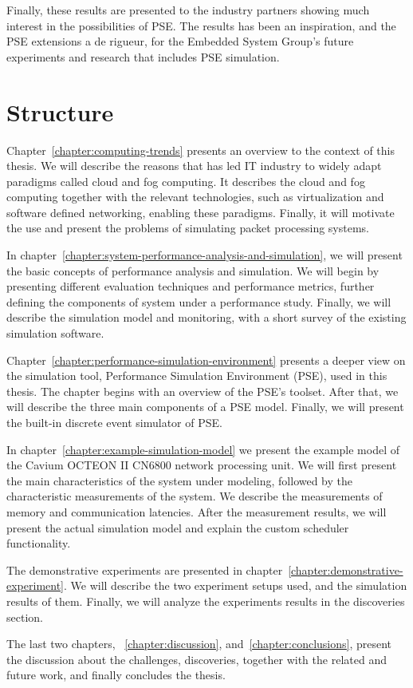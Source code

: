 Finally, these results are presented to the industry partners showing much interest in the possibilities of PSE. The results has been an inspiration, and the PSE extensions a de rigueur, for the Embedded System Group's future experiments and research that includes PSE simulation.

\section{Structure}
Chapter~\ref{chapter:computing-trends} presents an overview to the context of this thesis. We will describe the reasons that has led IT industry to widely adapt paradigms called cloud and fog computing. It describes the cloud and fog computing together with the relevant technologies, such as virtualization and software defined networking, enabling these paradigms. Finally, it will motivate the use and present the problems of simulating packet processing systems.

In chapter~\ref{chapter:system-performance-analysis-and-simulation}, we will present the basic concepts of performance analysis and simulation. We will begin by presenting different evaluation techniques and performance metrics, further defining the components of system under a performance study. Finally, we will describe the simulation model and monitoring, with a short survey of the existing simulation software.

Chapter~\ref{chapter:performance-simulation-environment} presents a deeper view on the simulation tool, Performance Simulation Environment (PSE), used in this thesis. The chapter begins with an overview of the PSE's toolset. After that, we will describe the three main components of a PSE model. Finally, we will present the built-in discrete event simulator of PSE.

In chapter~\ref{chapter:example-simulation-model} we present the example model of the Cavium OCTEON II CN6800 network processing unit. We will first present the main characteristics of the system under modeling, followed by the characteristic measurements of the system. We describe the measurements of memory and communication latencies. After the measurement results, we will present the actual simulation model and explain the custom scheduler functionality.

The demonstrative experiments are presented in chapter~\ref{chapter:demonstrative-experiment}. We will describe the two experiment setups used, and the simulation results of them. Finally, we will analyze the experiments results in the discoveries section.

The last two chapters, ~\ref{chapter:discussion}, and~\ref{chapter:conclusions}, present the discussion about the challenges, discoveries, together with the related and future work, and finally concludes the thesis.

